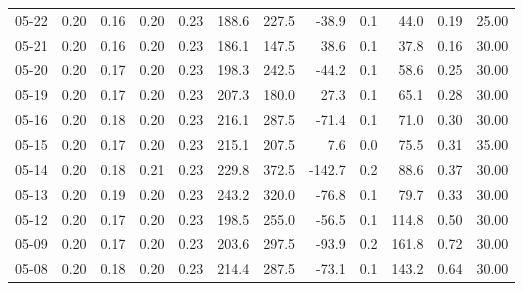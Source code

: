 \begin{threeparttable}
{\begin{tabular}{lrrrrrrrrrrr}
  05-22 &          0.20 &          0.16 &          0.20 &        0.23 &               188.6 &               227.5 &      -38.9 &                 0.1 &             44.0 &            0.19 &                  25.00 \\
  05-21 &          0.20 &          0.16 &          0.20 &        0.23 &               186.1 &               147.5 &       38.6 &                 0.1 &             37.8 &            0.16 &                  30.00 \\
  05-20 &          0.20 &          0.17 &          0.20 &        0.23 &               198.3 &               242.5 &      -44.2 &                 0.1 &             58.6 &            0.25 &                  30.00 \\
  05-19 &          0.20 &          0.17 &          0.20 &        0.23 &               207.3 &               180.0 &       27.3 &                 0.1 &             65.1 &            0.28 &                  30.00 \\
  05-16 &          0.20 &          0.18 &          0.20 &        0.23 &               216.1 &               287.5 &      -71.4 &                 0.1 &             71.0 &            0.30 &                  30.00 \\
  05-15 &          0.20 &          0.17 &          0.20 &        0.23 &               215.1 &               207.5 &        7.6 &                 0.0 &             75.5 &            0.31 &                  35.00 \\
  05-14 &          0.20 &          0.18 &          0.21 &        0.23 &               229.8 &               372.5 &     -142.7 &                 0.2 &             88.6 &            0.37 &                  30.00 \\
  05-13 &          0.20 &          0.19 &          0.20 &        0.23 &               243.2 &               320.0 &      -76.8 &                 0.1 &             79.7 &            0.33 &                  30.00 \\
  05-12 &          0.20 &          0.17 &          0.20 &        0.23 &               198.5 &               255.0 &      -56.5 &                 0.1 &            114.8 &            0.50 &                  30.00 \\
  05-09 &          0.20 &          0.17 &          0.20 &        0.23 &               203.6 &               297.5 &      -93.9 &                 0.2 &            161.8 &            0.72 &                  30.00 \\
  05-08 &          0.20 &          0.18 &          0.20 &        0.23 &               214.4 &               287.5 &      -73.1 &                 0.1 &            143.2 &            0.64 &                  30.00 \\

\end{tabular}}
\end{threeparttable}
